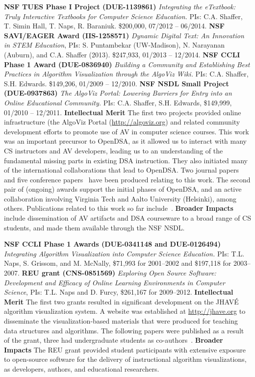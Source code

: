 \documentclass[11pt]{article}
\begin{document}
\textbf{NSF TUES Phase I Project (DUE-1139861)}
\emph{Integrating the eTextbook: Truly Interactive Textbooks for Computer
Science Education.} PIs: C.A. Shaffer, T. Simin Hall, T. Naps,
R. Baraniuk.
\$200,000, 07/2012 -- 06/2014.
\textbf{NSF SAVI/EAGER Award (IIS-1258571)}
\emph{Dynamic Digital Text: An Innovation in STEM Education},
PIs: S. Puntambekar (UW-Madison), N. Narayanan (Auburn),
and C.A. Shaffer (2013). 
\$247,933, 01/2013 -- 12/2014.
\textbf{NSF CCLI Phase 1 Award (DUE-0836940)}
\emph{Building a Community and Establishing Best Practices in
Algorithm Visualization through the AlgoViz Wiki.}
PIs: C.A. Shaffer, S.H. Edwards.
\$149,206, 01/2009 -- 12/2010.
\textbf{NSF NSDL Small Project (DUE-0937863)}
\emph{The AlgoViz Portal: Lowering Barriers for Entry into an Online
Educational Community.} PIs: C.A. Shaffer, S.H. Edwards, \$149,999,
01/2010 -- 12/2011.
\textbf{Intellectual Merit} 
The first two projects provided online infrastructure
(the AlgoViz Portal (\url{http://algoviz.org}) and related community
development efforts to promote use of AV in computer science courses.
This work was an important precursor to OpenDSA, as it
allowed us to interact with many CS instructors and AV developers,
leading us to an understanding of the fundamental missing parts in
existing DSA instruction.
They also initiated many of the international collaborations that lead
to OpenDSA.
Two journal papers~\cite{Shaffer10,Fouh:AV11} and five conference
papers~\cite{ShafferSIGCSE07,ShafferSIGCSE10,ShafferSIGCSE11,ShafferPVW11,ShafferKoli11}
have been produced relating to this work.
The second pair of (ongoing) awards support the initial phases of
OpenDSA, and an active collaboration involving Virginia Tech and Aalto
University (Helsinki), among others.
Publications related to this work so far
include~\cite{KorhonenWG13,Karavirta:ITiCSE13,Hall13,Fouh14}.
\textbf{Broader Impacts}
include dissemination of AV artifacts and DSA courseware to a broad
range of CS students, and made them available through the NSF NSDL.

\medskip

\textbf{NSF CCLI Phase 1 Awards (DUE-0341148 and DUE-0126494)}
\emph{Integrating Algorithm Visualization into Computer Science
Education.} PIs: T.L. Naps, S. Grissom, and M. McNally,
\$71,993 for 2001--2002 and \$197,118 for 2003--2007.
\textbf{REU grant (CNS-0851569)}
\emph{Exploring Open Source Software: Development and Efficacy of
Online Learning Environments in Computer Science},
PIs: T.L. Naps and D. Furcy,
\$261,167 for 2009--2012.
\textbf{Intellectual Merit} 
The first two grants resulted in significant development on the
JHAV\'{E} algorithm visualization system.
A website was established at \url{http://jhave.org} to disseminate
the visualization-based materials that were produced for teaching
data structures and algorithms.
The following papers were published as a result of the
grant, three had undergraduate students as
co-authors~\cite{furcy2007blocktree,lucas2003visualgraph,NaRoPVW:2006,GAIGS_support,Naps05,NaMcPVW:2006,GrMcNa:2003,NaGr:2002,RoNa:2002}.
\textbf{Broader Impacts}
The REU grant provided student participants with extensive exposure to
open-source software for the delivery of instructional algorithm
visualizations, as developers, authors, and educational researchers.
\end{document}
